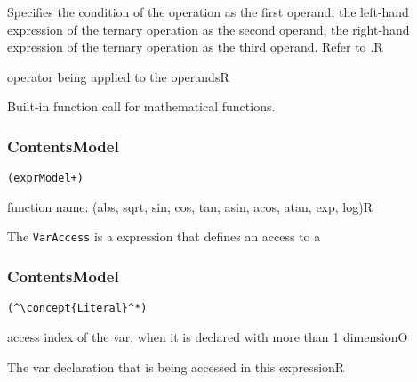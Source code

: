 \begin{HIRChildElements}
	{Specifies the condition of the operation as the first operand, the 
	 left-hand expression of the ternary operation as the second 
	 operand, the right-hand expression of the ternary operation as the third 
	 operand. Refer to .}{R}
\end{HIRChildElements}

\begin{HIRAttributes}
	{operator being applied to the operands}{R}
\end{HIRAttributes}

Built-in function call for mathematical functions.


\subsubsection*{ContentsModel}{}
\begin{lstlisting}[style=default,frame=none]
(exprModel+)
\end{lstlisting}


\begin{HIRChildElements}
\end{HIRChildElements}

\begin{HIRAttributes}
	{function name: (abs, sqrt, sin, cos, tan, asin, acos, atan, exp, log)}{R}
\end{HIRAttributes}

The {\tt VarAccess} is a expression that defines an access to a 

\subsubsection*{ContentsModel}{}

\begin{lstlisting}[style=default,frame=none]
(^\concept{Literal}^*)
\end{lstlisting}

\begin{HIRChildElements}
	{access index of the var, when it is declared with more than 1 dimension}{O}
\end{HIRChildElements}

\begin{HIRAttributes}
	{The var declaration that is being accessed in this expression}{R}
\end{HIRAttributes}

